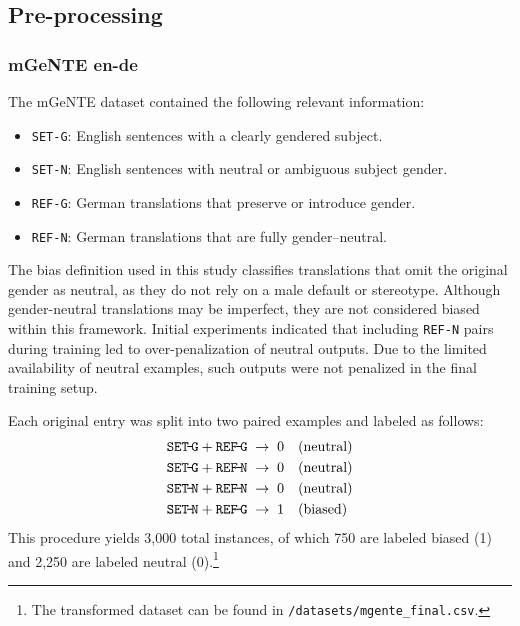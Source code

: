 \subsection{Pre-processing}

\subsubsection{mGeNTE en-de} 
The mGeNTE dataset contained the following relevant information:  

\begin{itemize}  
  \item \texttt{SET-G}: English sentences with a clearly gendered subject.  
  \item \texttt{SET-N}: English sentences with neutral or ambiguous subject gender.  
  \item \texttt{REF-G}: German translations that preserve or introduce gender.  
  \item \texttt{REF-N}: German translations that are fully gender–neutral.  
\end{itemize}  

\noindent
The bias definition used in this study classifies translations that omit the original gender as neutral, as they do not rely on a male default or stereotype. Although gender-neutral translations may be imperfect, they are not considered biased within this framework. Initial experiments indicated that including \texttt{REF-N} pairs during training led to over-penalization of neutral outputs. Due to the limited availability of neutral examples, such outputs were not penalized in the final training setup.

Each original entry was split into two paired examples and labeled as follows:  
\[
\begin{aligned}
\texttt{SET\!-\!G} + \texttt{REF\!-\!G} &\;\rightarrow\; 0 \quad(\text{neutral})\\
\texttt{SET\!-\!G} + \texttt{REF\!-\!N} &\;\rightarrow\; 0 \quad(\text{neutral})\\
\texttt{SET\!-\!N} + \texttt{REF\!-\!N} &\;\rightarrow\; 0 \quad(\text{neutral})\\
\texttt{SET\!-\!N} + \texttt{REF\!-\!G} &\;\rightarrow\; 1 \quad(\text{biased})
\end{aligned}
\]  
This procedure yields 3,000 total instances, of which 750 are labeled biased (1) and 2,250 are labeled neutral (0).\footnote{The transformed dataset can be found in \texttt{/datasets/mgente\_final.csv}.} 

